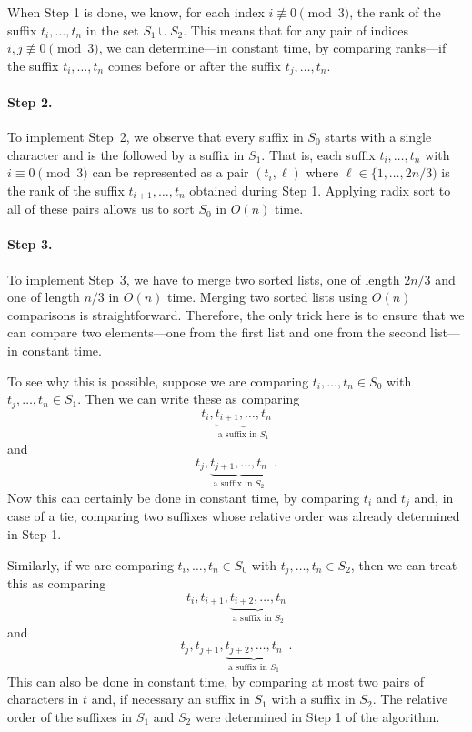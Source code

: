 When Step 1 is done, we know, for each index $i\not\equiv 0\pmod 3$,
the rank of the suffix $t_i,\ldots,t_n$ in the set $S_1\cup S_2$.
This means that for any pair of indices $i,j\not\equiv 0\pmod 3$, we
can determine---in constant time, by comparing ranks---if the suffix
$t_i,\ldots,t_n$ comes before or after the suffix $t_j,\ldots,t_n$.

\paragraph{Step 2.}
To implement Step~2, we observe that every suffix in $S_0$ starts with
a single character and is the followed by a suffix in $S_1$.  That is,
each suffix $t_i,\ldots,t_n$ with $i\equiv 0\pmod 3$ can be represented
as a pair $(t_i,\ell)$ where $\ell\in\{1,\ldots,2n/3)$ is the rank of
the suffix $t_{i+1},\ldots,t_n$ obtained during Step 1.  Applying radix
sort to all of these pairs allows us to sort $S_0$ in $O(n)$ time.

\paragraph{Step 3.}
To implement Step~3, we have to merge two sorted lists, one of length $2n/3$ and one of length $n/3$ in $O(n)$ time.  Merging two sorted lists using $O(n)$ comparisons is straightforward. Therefore, the only trick here is to ensure that we can compare two elements---one from the first list and one from the second list---in constant time.  

To see why this is possible, suppose we are comparing $t_i,\ldots,t_n\in S_0$ with $t_j,\ldots,t_n\in S_1$.  Then we can write these as comparing
\[
   t_i,\underbrace{t_{i+1},\ldots,t_n}_{\text{a suffix in $S_1$}}
\]
and 
\[
   t_j,\underbrace{t_{j+1},\ldots,t_n}_{\text{a suffix in $S_2$}}
    \enspace .
\]
Now this can certainly be done in constant time, by comparing $t_i$ and $t_j$ and, in case of a tie, comparing two suffixes whose relative order was already determined in Step 1.

Similarly, if we are comparing 
$t_i,\ldots,t_n\in S_0$ with $t_j,\ldots,t_n\in S_2$, then we can treat this as comparing
\[
   t_i,t_{i+1},\underbrace{t_{i+2},\ldots,t_n}_{\text{a suffix in $S_2$}}
\]
and 
\[
   t_j,t_{j+1},\underbrace{t_{j+2},\ldots,t_n}_{\text{a suffix in $S_1$}}
    \enspace .
\]
This can also be done in constant time, by comparing at most two
pairs of characters in $t$ and, if necessary an suffix in $S_1$ with a suffix
in $S_2$.  The relative order of the suffixes in $S_1$ and $S_2$ were determined in Step 1 of the algorithm.

